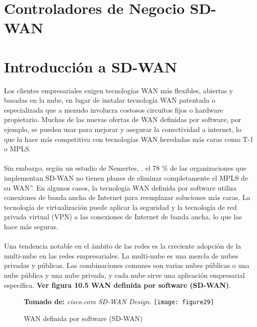 \section{Controladores de Negocio SD-WAN}
\label{cha:Controladores de Negocio SD-WAN}


\section{Introducción a SD-WAN}
\label{sec:Introducción a SD-WAN}

Los clientes empresariales exigen tecnologías WAN más flexibles, abiertas y basadas en la nube, en lugar de instalar tecnología WAN patentada o especializada que a menudo involucra costosos circuitos fijos o hardware propietario. Muchas de las nuevas ofertas de WAN definidas por software, por ejemplo, se pueden usar para mejorar y asegurar la conectividad a internet, lo que la hace más competitiva
con tecnologías WAN heredadas más caras como T-1 o MPLS.
\\
\\
Sin embargo, según un estudio de Nemertes, . el 78 \% de las organizaciones que implementan SD-WAN no tienen planes de eliminar completamente el MPLS de su WAN”. En algunos casos, la tecnología WAN definida por software utiliza conexiones de banda ancha de Internet para reemplazar soluciones más caras. La tecnología de virtualización puede aplicar la seguridad y la tecnología de red privada virtual (VPN) a las conexiones
de Internet de banda ancha, lo que las hace más seguras.
\\
\\
Una tendencia notable en el ámbito de las redes es la creciente adopción de la multi-nube en las redes empresariales. La multi-nube es una mezcla de nubes privadas y públicas. Las combinaciones comunes son varias nubes públicas o una nube pública y una nube privada, y cada nube sirve una aplicación empresarial específica.
\textbf{Ver figura 10.5 WAN definida por software (SD-WAN)}.


\begin{figure}[htbp]
 \textbf{Tomado de:} \textit{cisco.com SD-WAN Design}.
  \centering
    {\texttt{[image: figure29]}}%
  \caption{WAN definida por software (SD-WAN)}
  \label{fig:fig2subfig}
\end{figure}


